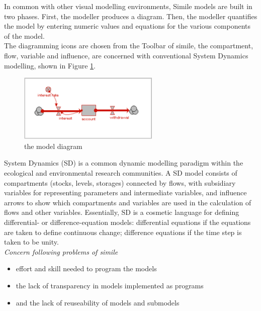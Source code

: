 In common with other visual modelling environments, Simile models are built in two phases. First, the modeller produces a diagram. Then, the modeller quantifies the model by entering numeric values and equations for the various components of the model.\\
The diagramming icons are chosen from the Toolbar of simile, the compartment, flow, variable and influence, are concerned with conventional System Dynamics modelling, shown in Figure \ref{fig:The model diagram}.

\begin{figure}[htbp]
\centering
\includegraphics[width=0.6\textwidth]{pics/simile/account_example.png}
\caption{the model diagram}
\label{fig:The model diagram}	
\end{figure}

System Dynamics (SD) is a common dynamic modelling paradigm within the ecological and environmental research communities. A SD model consists of compartments (stocks, levels, storages) connected by flows, with subsidiary variables for representing parameters and intermediate variables, and influence arrows to show which compartments and variables are used in the calculation of flows and other variables. Essentially, SD is a cosmetic language for defining differential- or difference-equation models: differential equations if the equations are taken to define continuous change; difference equations if the time step is taken to be unity.\\

\emph{Concern following problems of simile}
\begin{itemize}
	\item effort and skill needed to program the models
	\item the lack of transparency in models implemented as programs
	\item and the lack of reuseability of models and submodels
\end{itemize}


	
